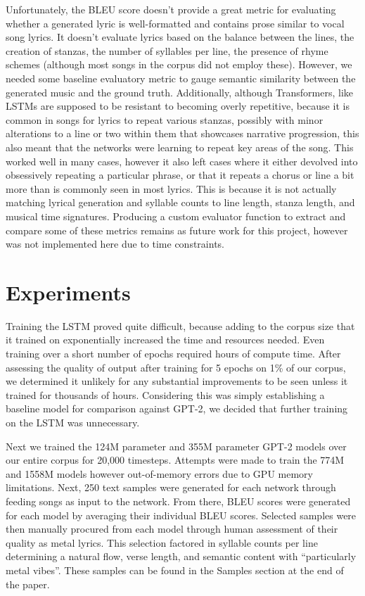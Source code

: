 \documentclass[11pt]{article}
\begin{document}
Unfortunately, the BLEU score doesn’t provide a great metric for evaluating whether a generated lyric is well-formatted and contains prose similar to vocal song lyrics. It doesn’t evaluate lyrics based on the balance between the lines, the creation of stanzas, the number of syllables per line, the presence of rhyme schemes (although most songs in the corpus did not employ these). However, we needed some baseline evaluatory metric to gauge semantic similarity between the generated music and the ground truth. Additionally, although Transformers, like LSTMs are supposed to be resistant to becoming overly repetitive, because it is common in songs for lyrics to repeat various stanzas, possibly with minor alterations to a line or two within them that showcases narrative progression, this also meant that the networks were learning to repeat key areas of the song. This worked well in many cases, however it also left cases where it either devolved into obsessively repeating a particular phrase, or that it repeats a chorus or line a bit more than is commonly seen in most lyrics. This is because it is not actually matching lyrical generation and syllable counts to line length, stanza length, and musical time signatures. Producing a custom evaluator function to extract and compare some of these metrics remains as future work for this project, however was not implemented here due to time constraints.

\section{Experiments}
Training the LSTM proved quite difficult, because adding to the corpus size that it trained on exponentially increased the time and resources needed. Even training over a short number of epochs required hours of compute time. After assessing the quality of output after training for 5 epochs on 1\% of our corpus, we determined it unlikely for any substantial improvements to be seen unless it trained for thousands of hours. Considering this was simply establishing a baseline model for comparison against GPT-2, we decided that further training on the LSTM was unnecessary.

Next we trained the 124M parameter and 355M parameter GPT-2 models over our entire corpus for 20,000 timesteps. Attempts were made to train the 774M and 1558M models however out-of-memory errors due to GPU memory limitations. Next, 250 text samples were generated for each network through feeding songs as input to the network. From there, BLEU scores were generated for each model by averaging their individual BLEU scores. Selected samples were then manually procured from each model through human assessment of their quality as metal lyrics. This selection factored in syllable counts per line determining a natural flow, verse length, and semantic content with “particularly metal vibes”. These samples can be found in the Samples section at the end of the paper.
\end{document}
